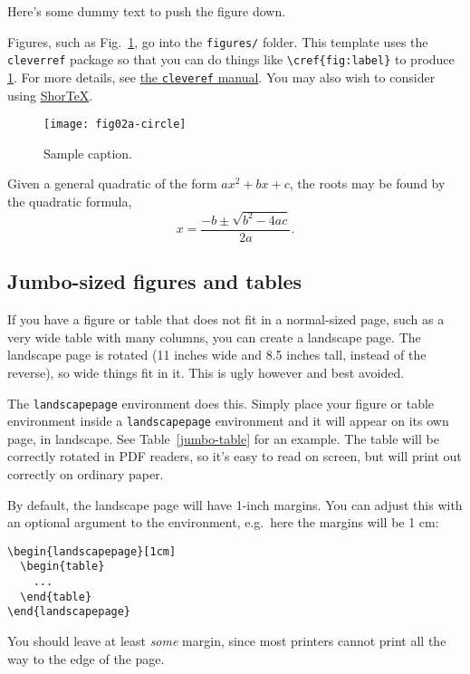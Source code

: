 \documentclass[draft]{ubcstatproposal} %
\theoremstyle{plain}
\begin{document}
Here's some dummy text to push the figure down. \lipsum[2]

Figures, such as Fig.~\ref{fig:label}, go into the \texttt{figures/} folder. This
template uses the \verb|cleverref| package so that you can do things like
\verb|\cref{fig:label}| to produce \cref{fig:label}. For more details, see
\href{https://ctan.mirror.globo.tech/macros/latex/contrib/cleveref/cleveref.pdf}%
{the \texttt{cleveref} manual}. You may also wish to consider using 
\href{https://github.com/trevorcampbell/shortex.git}{Shor\TeX}.

\begin{figure}
  \centering
  \texttt{[image: fig02a-circle]}
  \caption{Sample caption.}
  \label{fig:label}
\end{figure}

Given a general quadratic of the form $ax^2 + bx + c$, the roots may be found by
the quadratic formula,
\[
  x = \frac{-b \pm \sqrt{b^2 - 4ac}}{2a}.
\]

\subsection{Jumbo-sized figures and tables}

If you have a figure or table that does not fit in a normal-sized page, such as
a very wide table with many columns, you can create a landscape page. The
landscape page is rotated (11 inches wide and 8.5 inches tall, instead of the
reverse), so wide things fit in it. This is ugly however and best avoided.

The \verb|landscapepage| environment does this. Simply place your figure or
table environment inside a \verb|landscapepage| environment and it will appear
on its own page, in landscape. See Table~\ref{jumbo-table} for an example. The
table will be correctly rotated in PDF readers, so it's easy to read on screen,
but will print out correctly on ordinary paper.

By default, the landscape page will have 1-inch margins. You can adjust this
with an optional argument to the environment, e.g.\ here the margins will be 1
cm:
\begin{verbatim}
\begin{landscapepage}[1cm]
  \begin{table}
    ...
  \end{table}
\end{landscapepage}
\end{verbatim}
You should leave at least \emph{some} margin, since most printers cannot print
all the way to the edge of the page.
\end{document}
